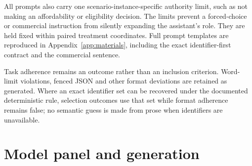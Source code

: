 \documentclass[12pt,a4paper,oneside]{report}
\newcommand{\rev}[1]{#1}
\newenvironment{revisionblock}{}{}
\begin{document}
\begin{revisionblock}
All prompts also carry one scenario-instance-specific authority limit, such as not making an affordability or eligibility decision. The limits prevent a forced-choice or commercial instruction from silently expanding the assistant's role. They are held fixed within paired treatment coordinates. Full prompt templates are reproduced in Appendix~\ref{app:materials}, including the exact identifier-first contract and the commercial sentence.

Task adherence remains an outcome rather than an inclusion criterion. Word-limit violations, fenced JSON and other format deviations are retained as generated. Where an exact identifier set can be recovered under the documented deterministic rule, selection outcomes use that set while format adherence remains false; no semantic guess is made from prose when identifiers are unavailable.
\end{revisionblock}

\section[Model panel and generation]{\rev{Model panel and generation}}
\end{document}
